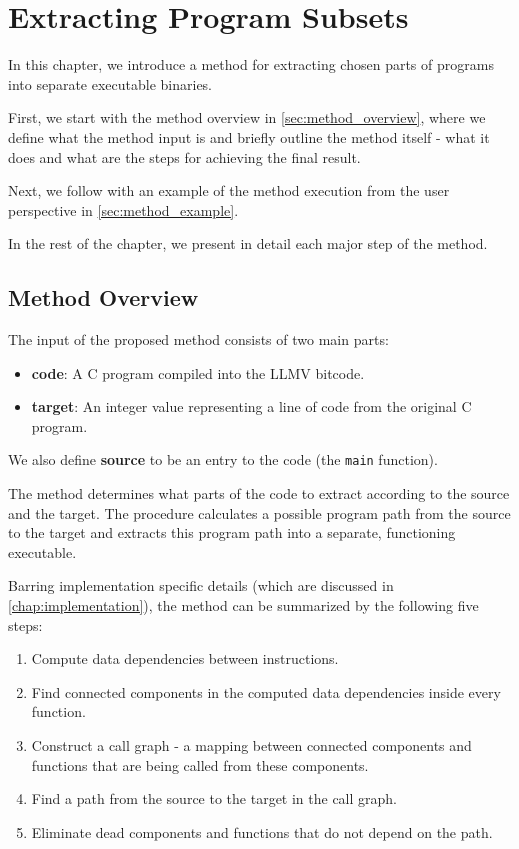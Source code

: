 \documentclass[12pt, twoside]{fithesis2}
\renewcommand{\_}{\leavevmode \kern0.07em\vbox{\hrule width0.4em}}
\newcommand{\squarebullet}{\textcolor{black}{\raisebox{0.15em}{\rule{4pt}{4pt}}}}
\newenvironment{myItemize}{
  \begin{itemize}[
    leftmargin=2em,
    rightmargin=1em,
    itemsep=\parskip,
    parsep=0em,
    topsep=0em,
    partopsep=0em
]
  \renewcommand{\labelitemi}{\squarebullet}
  \renewcommand{\labelitemii}{\textbullet}
}{
  \end{itemize}
}
\newenvironment{myEnumerate}{
  \begin{enumerate}[
    leftmargin=2em,
    rightmargin=1em,
    itemsep=\parskip,
    parsep=0em,
    topsep=0em,
    partopsep=0em
]
}{
  \end{enumerate}
}
\begin{document}
\chapter{Extracting Program Subsets}
\label{chap:design}

In this chapter, we introduce a method for extracting chosen parts of programs
into separate executable binaries.

First, we start with the method overview in \autoref{sec:method_overview},
where we define what the method input is and briefly outline the method itself
- what it does and what are the steps for achieving the final result.

Next, we follow with an example of the method execution from the user
perspective in \autoref{sec:method_example}.

In the rest of the chapter, we present in detail each major step of the method.

\section{Method Overview}
\label{sec:method_overview}

The input of the proposed method consists of two main parts:

\begin{myItemize}
\item \textbf{code}: A C program compiled into the LLMV bitcode.
\item \textbf{target}: An integer value representing a line of code from the
original C program.
\end{myItemize}

We also define \textbf{source} to be an entry to the code
(the \texttt{main} function).


The method determines what parts of the code to extract according to
the source and the target.
The procedure calculates a possible program path from the source to the
target and extracts this program path into a separate, functioning
executable.

Barring implementation specific details (which are discussed in
\autoref{chap:implementation}), the method can be summarized by the following
five steps:

\begin{myEnumerate}
\item Compute data dependencies between instructions.
\item Find connected components in the computed data dependencies inside
every function.
\item Construct a call graph - a mapping between connected components and functions
that are being called from these components.
\item Find a path from the source to the target in the call graph.
\item Eliminate dead components and functions that do not depend on the path.
\end{myEnumerate}
\end{document}
